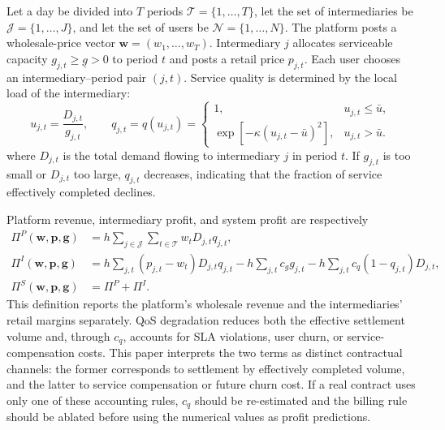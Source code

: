 \documentclass[11pt,a4paper]{article}
\newcommand{\qos}{q}
\newcommand{\T}{\mathcal{T}}
\newcommand{\J}{\mathcal{J}}
\newcommand{\N}{\mathcal{N}}
\newcommand{\D}{D}
\newcommand{\w}{\boldsymbol{w}}
\newcommand{\p}{\boldsymbol{p}}
\newcommand{\g}{\boldsymbol{g}}
\begin{document}
Let a day be divided into $T$ periods $\T=\{1,\ldots,T\}$, let the set of intermediaries be $\J=\{1,\ldots,J\}$, and let the set of users be $\N=\{1,\ldots,N\}$. The platform posts a wholesale-price vector $\w=(w_1,\ldots,w_T)$. Intermediary $j$ allocates serviceable capacity $g_{j,t}\ge \underline g>0$ to period $t$ and posts a retail price $p_{j,t}$. Each user chooses an intermediary--period pair $(j,t)$. Service quality is determined by the local load of the intermediary:
\begin{equation}
  u_{j,t}=\frac{\D_{j,t}}{g_{j,t}},\qquad
  q_{j,t}=\qos(u_{j,t})=
  \begin{cases}
    1, & u_{j,t}\le \bar u,\\[2pt]
    \exp[-\kappa(u_{j,t}-\bar u)^2], & u_{j,t}>\bar u.
  \end{cases}
  \label{eq:qos}
\end{equation}
where $\D_{j,t}$ is the total demand flowing to intermediary $j$ in period $t$. If $g_{j,t}$ is too small or $\D_{j,t}$ too large, $q_{j,t}$ decreases, indicating that the fraction of service effectively completed declines.

Platform revenue, intermediary profit, and system profit are respectively
\begin{align}
  \Pi^P(\w,\p,\g)
  &=h\sum_{j\in\J}\sum_{t\in\T} w_t\D_{j,t}q_{j,t}, \label{eq:platform_profit}\\
  \Pi^I(\w,\p,\g)
  &=h\sum_{j,t}(p_{j,t}-w_t)\D_{j,t}q_{j,t}
    -h\sum_{j,t}c_g g_{j,t}
    -h\sum_{j,t}c_q(1-q_{j,t})\D_{j,t}, \label{eq:intermediary_profit}\\
  \Pi^S(\w,\p,\g)&=\Pi^P+\Pi^I. \label{eq:system_profit}
\end{align}
This definition reports the platform's wholesale revenue and the intermediaries' retail margins separately. QoS degradation reduces both the effective settlement volume and, through $c_q$, accounts for SLA violations, user churn, or service-compensation costs. This paper interprets the two terms as distinct contractual channels: the former corresponds to settlement by effectively completed volume, and the latter to service compensation or future churn cost. If a real contract uses only one of these accounting rules, $c_q$ should be re-estimated and the billing rule should be ablated before using the numerical values as profit predictions.
\end{document}
